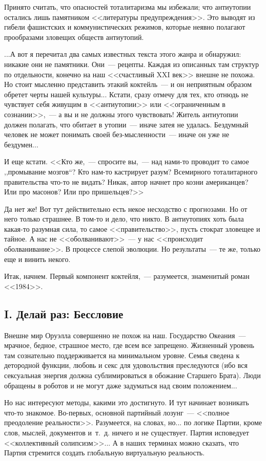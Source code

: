 \documentclass{scrbook}
\newcommand{\glqq}{,,}
\newcommand{\grqq}{``}
\newcommand{\flqq}{<<}
\newcommand{\frqq}{>>}
\newcommand{\mdash}{~--- }
\newcommand{\commamdash}{~--- } %
\newcommand{\essaysection}[1]{\subsection*{#1}\nopagebreak}
\begin{document}
Принято считать, что опасностей тоталитаризма мы избежали; что антиутопии остались лишь памятником {\flqq}литературы предупреждения{\frqq}. Это выводят из гибели фашистских и коммунистических режимов, которые неявно полагают прообразами зловещих обществ антиутопий.

...А вот я перечитал два самых известных текста этого жанра и обнаружил: никакие они не памятники. Они{\mdash}рецепты. Каждая из описанных там структур по отдельности, конечно на наш {\flqq}счастливый XXI век{\frqq} внешне не похожа. Но стоит мысленно представить этакий коктейль{\mdash}и он неприятным образом обретет черты нашей культуры... Кстати, сразу отмечу для тех, кто отнюдь не чувствует себя живущим в {\flqq}антиутопии{\frqq} или {\flqq}ограниченным в сознании{\frqq},{\commamdash}а вы и не должны этого чувствовать! Житель антиутопии должен полагать, что обитает в утопии{\mdash}иначе затея не удалась. Бездумный человек не может понимать своей без-мысленности{\mdash}иначе он уже не бездумен...

И еще кстати. {\flqq}Кто же,{\commamdash}спросите вы,{\commamdash}над нами-то проводит то самое {\glqq}промывание мозгов{\grqq}? Кто нам-то кастрирует разум? Всемирного тоталитарного правительства что-то не видать? Никак, автор начнет про козни американцев? Или про масонов? Или про пришельцев?{\frqq}

Да нет же! Вот тут действительно есть некое несходство с прогнозами. Но от него только страшнее. В том-то и дело, что никто. В антиутопиях хоть была какая-то разумная сила, то самое {\flqq}правительство{\frqq}, пусть стократ зловещее и тайное. А нас не {\flqq}оболванивают{\frqq}{\mdash}у нас {\flqq}происходит оболванивание{\frqq}. В процессе слепой эволюции. Но результаты{\mdash}те же, только еще и винить некого.

Итак, начнем. Первый компонент коктейля,{\commamdash}разумеется, знаменитый роман {\flqq}1984{\frqq}.
       
\essaysection{I. Делай раз: Бессловие}
       
Внешне мир Оруэлла совершенно не похож на наш. Государство Океания{\mdash}мрачное, бедное, страшное место, где всем все запрещено. Жизненный уровень там сознательно поддерживается на минимальном уровне. Семья сведена к детородной функции, любовь и секс для удовольствия преследуются (ибо вся сексуальная энергия должна сублимироваться в обожание Старшего Брата). Люди обращены в роботов и не могут даже задуматься над своим положением...

Но нас интересуют методы, какими это достигнуто. И тут начинает возникать что-то знакомое. Во-первых, основной партийный лозунг{\mdash}{\flqq}полное преодоление реальности{\frqq}. Разумеется, на словах, но... по логике Партии, кроме слов, мыслей, документов и~т.~д. ничего и не существует. Партия исповедует {\flqq}коллективный солипсизм{\frqq}... А в наших терминах можно сказать, что Партия стремится создать глобальную виртуальную реальность.
\end{document}
